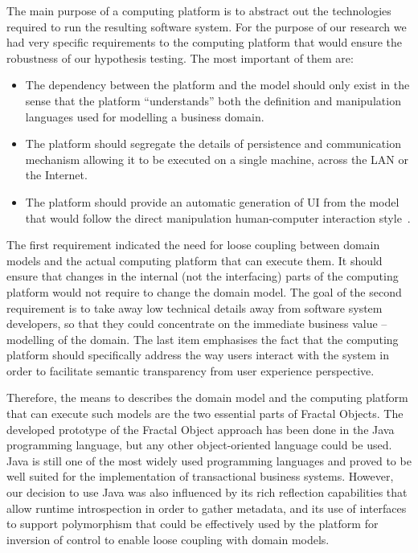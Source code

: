 \documentclass[a4paper,12pt,oneside,openright,final]{memoir} %
\begin{document}
  The main purpose of a computing platform is to abstract out the technologies required to run the resulting software system.
  For the purpose of our research we had very specific requirements to the computing platform that would ensure the robustness of our hypothesis testing.
  The most important of them are:
  \begin{itemize}
    \item The dependency between the platform and the model should only exist in the sense that the platform ``understands'' both the definition and manipulation languages used for modelling a business domain.
    \item The platform should segregate the details of persistence and communication mechanism allowing it to be executed on a single machine, across the LAN or the Internet.
    \item The platform should provide an automatic generation of UI from the model that would follow the direct manipulation human-computer interaction style~\cite{shneiderman1982, shneiderman1983}.
  \end{itemize}

  The first requirement indicated the need for loose coupling between domain models and the actual computing platform that can execute them.
  It should ensure that changes in the internal (not the interfacing) parts of the computing platform would not require to change the domain model.
  The goal of the second requirement is to take away low technical details away from software system developers, so that they could concentrate on the immediate business value -- modelling of the domain.
  The last item emphasises the fact that the computing platform should specifically address the way users interact with the system in order to facilitate semantic transparency from user experience perspective.

  Therefore, the means to describes the domain model and the computing platform that can execute such models are the two essential parts of Fractal Objects.
  The developed prototype of the Fractal Object approach has been done in the Java programming language, but any other object-oriented language could be used.
  Java is still one of the most widely used programming languages and proved to be well suited for the implementation of transactional business systems.
  However, our decision to use Java was also influenced by its rich reflection capabilities that allow runtime introspection in order to gather metadata, and its use of interfaces to support polymorphism that could be effectively used by the platform for inversion of control to enable loose coupling with domain models.
\end{document}
